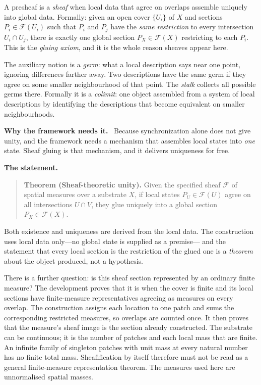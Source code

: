 \documentclass[11pt]{article}
\newcommand{\why}{\par\smallskip\noindent\textbf{Why the framework needs it.}\ }
\newcommand{\statement}{\par\smallskip\noindent\textbf{The statement.}\ }
\begin{document}
A presheaf is a \emph{sheaf} when local data that agree on overlaps assemble
uniquely into global data. Formally: given an open cover $\{U_i\}$ of $X$ and
sections $P_i\in\mathcal{F}(U_i)$ such that $P_i$ and $P_j$ have the
\emph{same restriction} to every intersection $U_i\cap U_j$, there is exactly
one global section $P_X\in\mathcal{F}(X)$ restricting to each $P_i$. This is
the \emph{gluing axiom}, and it is the whole reason sheaves appear here.

The auxiliary notion is a \emph{germ}: what a local description says near one
point, ignoring differences farther away. Two descriptions have the same germ
if they agree on some smaller neighbourhood of that point. The \emph{stalk}
collects all possible germs there. Formally it is a \emph{colimit}: one object
assembled from a system of local descriptions by identifying the descriptions
that become equivalent on smaller neighbourhoods.

\why
Because synchronization alone does not give unity, and the framework needs a
mechanism that assembles local states into \emph{one} state. Sheaf gluing is
that mechanism, and it delivers uniqueness for free.

\statement

\begin{quote}
\textbf{Theorem (Sheaf-theoretic unity).} Given the specified sheaf $\mathcal{F}$
of spatial measures over a substrate $X$, if local states
$P_U\in\mathcal{F}(U)$ agree on all intersections $U\cap V$, they glue
uniquely into a global section $P_X\in\mathcal{F}(X)$.
\end{quote}

\noindent
Both existence and uniqueness are derived from the local data. The
construction uses local data only---no global state is supplied as a premise---
and the statement that every local section is the restriction of the glued one
is a \emph{theorem} about the object produced, not a hypothesis.

There is a further question: is this sheaf section represented by an ordinary
finite measure? The development proves that it is when the cover is finite and
its local sections have finite-measure representatives agreeing as measures on
every overlap. The construction assigns each location to one patch and sums
the corresponding restricted measures, so overlaps are counted once. It then
proves that the measure's sheaf image is the section already constructed.
The substrate can be continuous; it is the number of patches and each local
mass that are finite. An infinite family of singleton patches with unit mass
at every natural number has no finite total mass. Sheafification by itself
therefore must not be read as a general finite-measure representation theorem.
The measures used here are unnormalised spatial masses.
\end{document}
